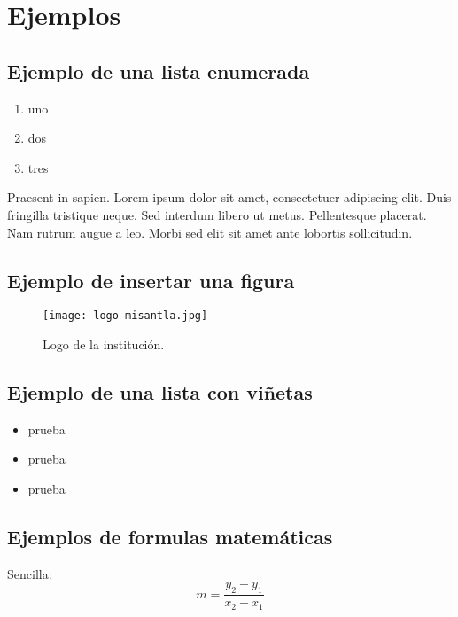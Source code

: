 \chapter{Ejemplos}

\section{Ejemplo de una lista enumerada}


\begin{enumerate}
	\item uno
	\item dos
	\item tres
\end{enumerate}

Praesent in sapien. Lorem ipsum dolor sit amet, consectetuer adipiscing 
elit. Duis fringilla tristique neque. Sed interdum libero ut metus. 
Pellentesque placerat. Nam rutrum augue a leo. Morbi sed elit sit amet 
ante lobortis sollicitudin.

\section{Ejemplo de insertar una figura}
\begin{figure}[!ht]
	\centering
	\texttt{[image: logo-misantla.jpg]}
	\caption{Logo de la institución.}
\end{figure}

\section{Ejemplo de una lista con viñetas}

\begin{itemize}
	\item prueba 
	\item prueba 
	\item prueba
\end{itemize}

\section{Ejemplos de formulas matemáticas}

Sencilla:
\[
m=\frac{y_2-y_1}{x_2-x_1}
\]

